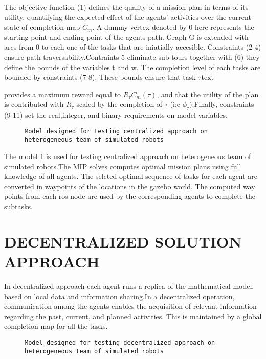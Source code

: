 \documentclass[conference]{IEEEtran}
\begin{document}
The objective function (1) defines the quality of a mission plan in terms of its utility, quantifying the expected effect of the agents' activities over the current state of completion map \(C_{m}\). A dummy vertex denoted by 0 here represents the starting point and ending point of the agents path. Graph G is extended with arcs from 0 to each one of the tasks that are iniatially accesible. Constraints (2-4) ensure path traversability.Contraints 5 eliminate sub-tours together with (6) they define the bounds of the variables t and w. The completion level of each tasks are bounded by constraints (7-8). These bounds ensure that task \(\tau\)text{ provides a maximum reward equal to \({R_{\tau}C_{m}(\tau)}\), and that the utility of the plan is contributed with \(R_{\tau}\) scaled by the completion of \(\tau\) (i;e \(\phi_{\tau}\)).Finally, constraints (9-11) set the real,integer, and binary requirements on model variables\cite{feo2016decentralized}.
\begin{figure}
\caption{\texttt{Model designed for testing centralized approach on heterogeneous team of simulated robots}}\label{cen_model}
\end{figure}

The model \ref{cen_model} is used for testing centralized approach on heterogeneous team of simulated robots.The MIP solves computes optimal mission plans using full knowledge of all agents. The selcted optimal sequence of tasks for each agent are converted in waypoints of the locations in the gazebo world. The computed way points from each ros node are used by the corresponding agents to complete the subtasks.  

\section{DECENTRALIZED SOLUTION APPROACH}
In decentralized approach each agent runs a replica of the mathematical model, based on local data and information sharing.In a decentralized operation, communication among the agents enables the acquisition of relevant information regarding the past, current, and planned activities. This is maintained by a global completion map for all the tasks\cite{feo2016decentralized}.


\begin{figure}
\caption{\texttt{Model designed for testing decentralized approach on heterogeneous team of simulated robots}}\label{decen_model}
\end{figure}

}
\end{document}
